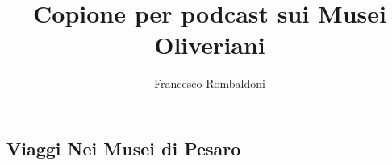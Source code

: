 \documentclass[hidelinks,12pt,a4paper]{article}
\begin{document}
	\begin{flushleft}
		
		\LARGE
		
		\title{\textbf{Copione per podcast sui Musei Oliveriani}}
		\author{Francesco Rombaldoni}
		\date{}
		
		\maketitle
		
		\setcounter{page}{1}
		\newpage
		
		\tableofcontents
		\newpage
		
		\section{Viaggi Nei Musei di Pesaro}
		

\end{flushleft}
\end{document}
